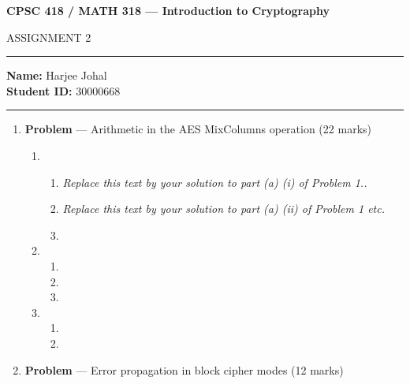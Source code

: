 \documentclass[11pt]{article}
\theoremstyle{definition}
\newcounter{problem}
\begin{document}
\begin{center}
{\bf \Large CPSC 418 / MATH 318 --- Introduction to Cryptography

ASSIGNMENT 2 }
\end{center}

\hrule 	

\textbf{Name:} Harjee Johal \\
\textbf{Student ID:} 30000668 \\

\medskip \hrule

\begin{enumerate} \itemsep 20pt

\item[] \textbf{Problem \theproblem} ---  Arithmetic in the AES {\sc MixColumns} operation (22
    marks)

\begin{enumerate}
\item \begin{enumerate}

\item \emph{Replace this text by your solution to part (a) (i) of Problem 1..}

\item \emph{Replace this text by your solution to part (a) (ii) of Problem 1 etc.}

\item
\end{enumerate}

\item \begin{enumerate}
\item

\item

\item
\end{enumerate}

\item

\begin{enumerate}
\item

\item
\end{enumerate}
\end{enumerate}

\newpage

\item[] \textbf{Problem \theproblem} --- Error propagation in block cipher modes (12 marks)


\end{enumerate}
\end{document}
